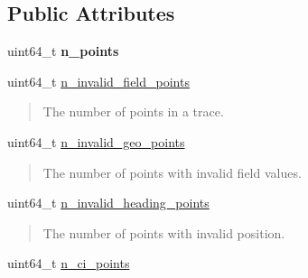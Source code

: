 \subsection*{Public Attributes}
\begin{DoxyCompactItemize}
\item 
uint64\+\_\+t {\bfseries n\+\_\+points}\hypertarget{structcvdi_1_1PointCounter_afbb269279caa378108ca6aa5f86042fe}{}\label{structcvdi_1_1PointCounter_afbb269279caa378108ca6aa5f86042fe}

\item 
uint64\+\_\+t \hyperlink{structcvdi_1_1PointCounter_ab329abe5fe52bd787dc2dc59afc03bc7}{n\+\_\+invalid\+\_\+field\+\_\+points}\hypertarget{structcvdi_1_1PointCounter_ab329abe5fe52bd787dc2dc59afc03bc7}{}\label{structcvdi_1_1PointCounter_ab329abe5fe52bd787dc2dc59afc03bc7}

\begin{DoxyCompactList}\small\item\em \begin{quote}
The number of points in a trace. \end{quote}
\end{DoxyCompactList}\item 
uint64\+\_\+t \hyperlink{structcvdi_1_1PointCounter_abccc4d82bf51f4cac2f8eb03b71f6b31}{n\+\_\+invalid\+\_\+geo\+\_\+points}\hypertarget{structcvdi_1_1PointCounter_abccc4d82bf51f4cac2f8eb03b71f6b31}{}\label{structcvdi_1_1PointCounter_abccc4d82bf51f4cac2f8eb03b71f6b31}

\begin{DoxyCompactList}\small\item\em \begin{quote}
The number of points with invalid field values. \end{quote}
\end{DoxyCompactList}\item 
uint64\+\_\+t \hyperlink{structcvdi_1_1PointCounter_ab051246dc41739c3f5133d58c6857617}{n\+\_\+invalid\+\_\+heading\+\_\+points}\hypertarget{structcvdi_1_1PointCounter_ab051246dc41739c3f5133d58c6857617}{}\label{structcvdi_1_1PointCounter_ab051246dc41739c3f5133d58c6857617}

\begin{DoxyCompactList}\small\item\em \begin{quote}
The number of points with invalid position. \end{quote}
\end{DoxyCompactList}\item 
uint64\+\_\+t \hyperlink{structcvdi_1_1PointCounter_a663df3cac0f4920c7a7afc8feb002f1d}{n\+\_\+ci\+\_\+points}\hypertarget{structcvdi_1_1PointCounter_a663df3cac0f4920c7a7afc8feb002f1d}{}\label{structcvdi_1_1PointCounter_a663df3cac0f4920c7a7afc8feb002f1d}


\end{DoxyCompactItemize}
